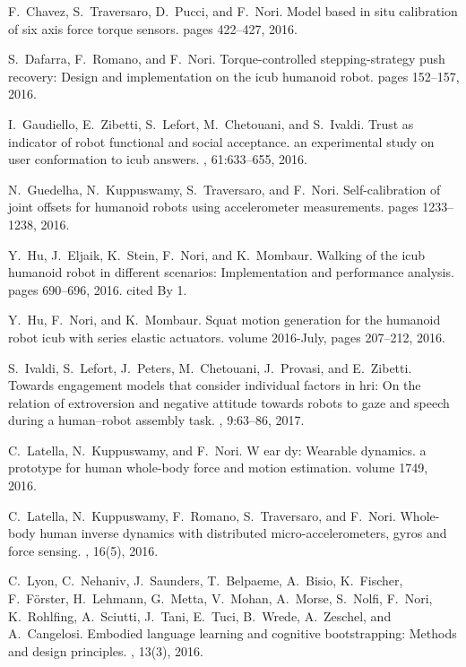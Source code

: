 \documentclass[12pt,a4paper,twoside]{article}
\begin{document}
\begin{thebibliography}{}
F.~Chavez, S.~Traversaro, D.~Pucci, and F.~Nori.
\newblock Model based in situ calibration of six axis force torque sensors.
\newblock pages 422--427, 2016.
 

S.~Dafarra, F.~Romano, and F.~Nori.
\newblock Torque-controlled stepping-strategy push recovery: Design and
  implementation on the icub humanoid robot.
\newblock pages 152--157, 2016.
 

I.~Gaudiello, E.~Zibetti, S.~Lefort, M.~Chetouani, and S.~Ivaldi.
\newblock Trust as indicator of robot functional and social acceptance. an
  experimental study on user conformation to icub answers.
, 61:633--655, 2016.

N.~Guedelha, N.~Kuppuswamy, S.~Traversaro, and F.~Nori.
\newblock Self-calibration of joint offsets for humanoid robots using
  accelerometer measurements.
\newblock pages 1233--1238, 2016.
 

Y.~Hu, J.~Eljaik, K.~Stein, F.~Nori, and K.~Mombaur.
\newblock Walking of the icub humanoid robot in different scenarios:
  Implementation and performance analysis.
\newblock pages 690--696, 2016.
\newblock cited By 1.

Y.~Hu, F.~Nori, and K.~Mombaur.
\newblock Squat motion generation for the humanoid robot icub with series
  elastic actuators.
\newblock volume 2016-July, pages 207--212, 2016.
 

S.~Ivaldi, S.~Lefort, J.~Peters, M.~Chetouani, J.~Provasi, and E.~Zibetti.
\newblock Towards engagement models that consider individual factors in hri: On
  the relation of extroversion and negative attitude towards robots to gaze and
  speech during a human--robot assembly task.
, 9:63--86, 2017.

C.~Latella, N.~Kuppuswamy, and F.~Nori.
\newblock W ear dy: Wearable dynamics. a prototype for human whole-body force
  and motion estimation.
\newblock volume 1749, 2016.
 

C.~Latella, N.~Kuppuswamy, F.~Romano, S.~Traversaro, and F.~Nori.
\newblock Whole-body human inverse dynamics with distributed
  micro-accelerometers, gyros and force sensing.
, 16(5), 2016.
 

C.~Lyon, C.~Nehaniv, J.~Saunders, T.~Belpaeme, A.~Bisio, K.~Fischer,
  F.~F{\"o}rster, H.~Lehmann, G.~Metta, V.~Mohan, A.~Morse, S.~Nolfi, F.~Nori,
  K.~Rohlfing, A.~Sciutti, J.~Tani, E.~Tuci, B.~Wrede, A.~Zeschel, and
  A.~Cangelosi.
\newblock Embodied language learning and cognitive bootstrapping: Methods and
  design principles.
, 13(3), 2016.
 


\end{thebibliography}
\end{document}
